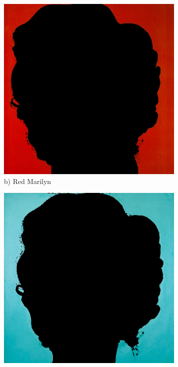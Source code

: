 \documentclass{article}
\begin{document}
\begin{figure}[htbp]
\begin{subfigure}[b]{0.19\textwidth}
        \includegraphics[width=\textwidth]{main_files/figure-latex/9_1_red_marilyn_background_extraction.jpg}
        \caption*{b) Red Marilyn}
    \end{subfigure}
    \hfill
    \begin{subfigure}[b]{0.19\textwidth}
        \includegraphics[width=\textwidth]{main_files/figure-latex/10_1_turq_marilyn_background_extraction.jpg}

\end{subfigure}
\end{figure}
\end{document}
